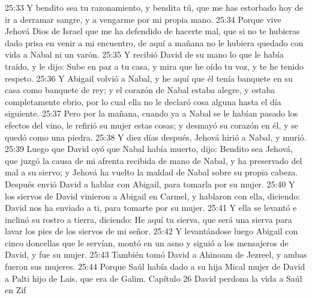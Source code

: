 25:33 Y bendito sea tu razonamiento, y bendita tú, que me has estorbado hoy de ir a derramar sangre, y a vengarme por mi propia mano. 
25:34 Porque vive Jehová Dios de Israel que me ha defendido de hacerte mal, que si no te hubieras dado prisa en venir a mi encuentro, de aquí a mañana no le hubiera quedado con vida a Nabal ni un varón.  
25:35 Y recibió David de su mano lo que le había traído, y le dijo: Sube en paz a tu casa, y mira que he oído tu voz, y te he tenido respeto.  
25:36 Y Abigail volvió a Nabal, y he aquí que él tenía banquete en su casa como banquete de rey; y el corazón de Nabal estaba alegre, y estaba completamente ebrio, por lo cual ella no le declaró cosa alguna hasta el día siguiente.  
25:37 Pero por la mañana, cuando ya a Nabal se le habían pasado los efectos del vino, le refirió su mujer estas cosas; y desmayó su corazón en él, y se quedó como una piedra.  
25:38 Y diez días después, Jehová hirió a Nabal, y murió.  
25:39 Luego que David oyó que Nabal había muerto, dijo: Bendito sea Jehová, que juzgó la causa de mi afrenta recibida de mano de Nabal, y ha preservado del mal a su siervo; y Jehová ha vuelto la maldad de Nabal sobre su propia cabeza. Después envió David a hablar con Abigail, para tomarla por su mujer.  
25:40 Y los siervos de David vinieron a Abigail en Carmel, y hablaron con ella, diciendo: David nos ha enviado a ti, para tomarte por su mujer.  
25:41 Y ella se levantó e inclinó su rostro a tierra, diciendo: He aquí tu sierva, que será una sierva para lavar los pies de los siervos de mi señor.  
25:42 Y levantándose luego Abigail con cinco doncellas que le servían, montó en un asno y siguió a los mensajeros de David, y fue su mujer.  
25:43 También tomó David a Ahinoam de Jezreel, y ambas fueron sus mujeres.  
25:44 Porque Saúl había dado a su hija Mical mujer de David a Palti hijo de Lais, que era de Galim.  
Capítulo 26
David perdona la vida a Saúl en Zif  

